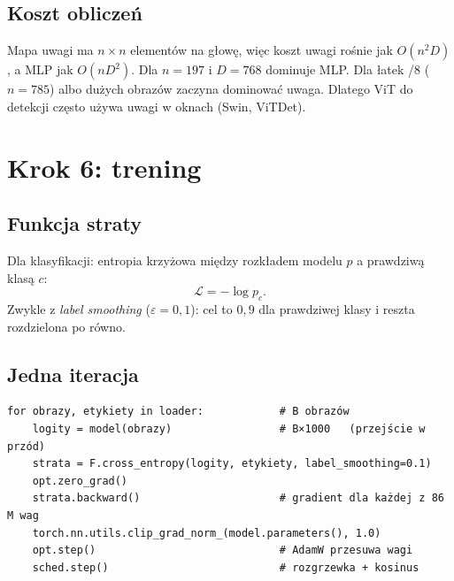 \documentclass[11pt,a4paper]{article}
\begin{document}
\subsection{Koszt obliczeń}
\label{sec:koszt}
Mapa uwagi ma $n\times n$ elementów na głowę, więc koszt uwagi rośnie jak $O(n^2D)$, a MLP jak $O(nD^2)$.
Dla $n=197$ i $D=768$ dominuje MLP. Dla łatek /8 ($n=785$) albo dużych obrazów zaczyna dominować
uwaga. Dlatego ViT do detekcji często używa uwagi w oknach (Swin, ViTDet).

\section{Krok 6: trening}

\subsection{Funkcja straty}
Dla klasyfikacji: entropia krzyżowa między rozkładem modelu $p$ a prawdziwą klasą $c$:
\[ \mathcal{L}=-\log p_c. \]
Zwykle z \emph{label smoothing} ($\varepsilon=0{,}1$): cel to $0{,}9$ dla prawdziwej klasy i reszta rozdzielona po równo.

\subsection{Jedna iteracja}
\begin{lstlisting}
for obrazy, etykiety in loader:            # B obrazów
    logity = model(obrazy)                 # B×1000   (przejście w przód)
    strata = F.cross_entropy(logity, etykiety, label_smoothing=0.1)
    opt.zero_grad()
    strata.backward()                      # gradient dla każdej z 86 M wag
    torch.nn.utils.clip_grad_norm_(model.parameters(), 1.0)
    opt.step()                             # AdamW przesuwa wagi
    sched.step()                           # rozgrzewka + kosinus
\end{lstlisting}
\end{document}
